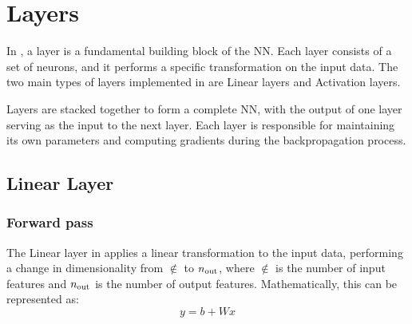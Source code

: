 \section{Layers} \label{sec:layer}

In \mfnet, a layer is a fundamental building block of the \acl{NN}. Each layer consists of a set of neurons, and it performs a specific transformation on the input data. The two main types of layers implemented in \mfnet are Linear layers and Activation layers.


Layers are stacked together to form a complete \acl{NN}, with the output of one layer serving as the input to the next layer.  Each layer is responsible for maintaining its own parameters and computing gradients during the backpropagation process.


\subsection{Linear Layer}
\subsubsection{Forward pass}
The Linear layer in \mfnet applies a linear transformation to the input data, performing a change in dimensionality from $\nin$ to $n_\text{out}$, where $\nin$ is the number of input features and $n_\text{out}$ is the number of output features. Mathematically, this can be represented as:
\begin{equation}
    y = b + Wx
\end{equation}

